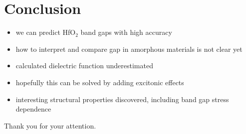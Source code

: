 \documentclass{beamer}
\begin{document}
\section{Conclusion}
\begin{frame}
		\begin{itemize}
			\item we can predict HfO$_2$ band gaps with high accuracy
			\item how to interpret and compare gap in amorphous materials is not clear yet
         \item calculated dielectric function underestimated
         \item hopefully this can be solved by adding excitonic effects
         \item interesting structural properties discovered, including band gap stress dependence
		\end{itemize}

      Thank you for your attention.
 
\end{frame}
\end{document}
